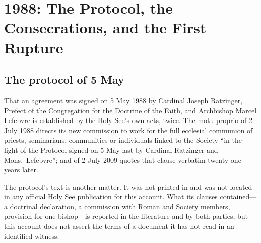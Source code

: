 \section{1988: The Protocol, the Consecrations, and the First Rupture}

\subsection{The protocol of 5 May}

That an agreement was signed on 5 May 1988 by Cardinal Joseph Ratzinger,
Prefect of the Congregation for the Doctrine of the Faith, and Archbishop
Marcel Lefebvre is established by the Holy See's own acts, twice. The
motu proprio  of 2 July 1988 directs its new
commission to work for the full ecclesial communion of priests,
seminarians, communities or individuals linked to the Society ``in the
light of the Protocol signed on 5 May last by Cardinal Ratzinger and
Mons.\ Lefebvre''; and  of 2 July 2009 quotes
that clause verbatim twenty-one years later.

The protocol's text is another matter. It was not printed in  and was not located in any official Holy See
publication for this account. What its clauses contained---a doctrinal
declaration, a commission with Roman and Society members, provision for
one bishop---is reported in the literature and by both parties, but this
account does not assert the terms of a document it has not read in an
identified witness.

